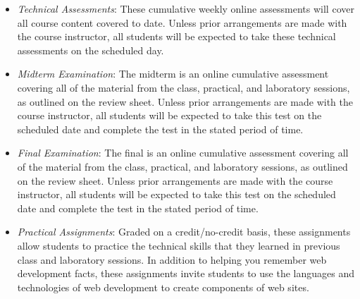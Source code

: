 \documentclass[11pt]{article}
\begin{document}
\begin{itemize}


  \item {\em Technical Assessments\/}: These cumulative weekly online
    assessments will cover all course content covered to date. Unless prior
    arrangements are made with the course instructor, all students will be
    expected to take these technical assessments on the scheduled day.

  \item {\em Midterm Examination\/}: The midterm is an online cumulative
    assessment covering all of the material from the class, practical, and
    laboratory sessions, as outlined on the review sheet. Unless prior
    arrangements are made with the course instructor, all students will be
    expected to take this test on the scheduled date and complete the test in
    the stated period of time.

  \item {\em Final Examination\/}: The final is an online cumulative assessment
    covering all of the material from the class, practical, and laboratory
    sessions, as outlined on the review sheet. Unless prior arrangements are
    made with the course instructor, all students will be expected to take this
    test on the scheduled date and complete the test in the stated period of
    time.


  \item {\em Practical Assignments\/}: Graded on a credit/no-credit basis, these
    assignments allow students to practice the technical skills that they
    learned in previous class and laboratory sessions. In addition to helping
    you remember web development facts, these assignments invite students to use
    the languages and technologies of web development to create components of
    web sites.


\end{itemize}
\end{document}

